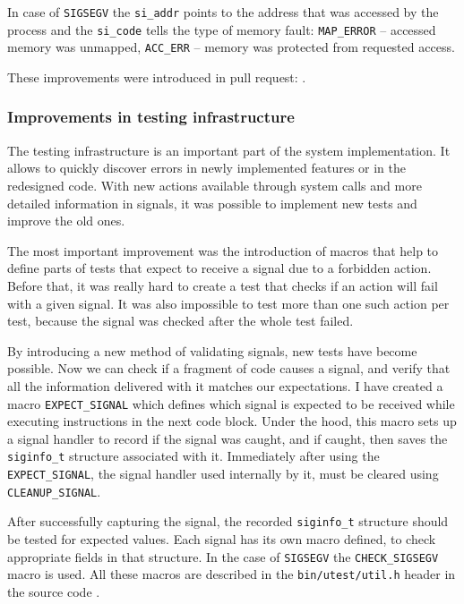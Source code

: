 In case of {\tt SIGSEGV} the \texttt{si_addr} points to the address that was accessed by the process and the \texttt{si_code}
tells the type of memory fault: \texttt{MAP_ERROR} -- accessed memory was unmapped, \texttt{ACC_ERR} -- memory was protected from requested access.

These improvements were introduced in pull request: .

\subsubsection{Improvements in testing infrastructure}

The testing infrastructure is an important part of the system implementation.
It allows to quickly discover errors in newly implemented features or in the redesigned code.
With new actions available through system calls and more detailed information in signals, it was possible to implement new tests and improve the old ones.

The most important improvement was the introduction of macros that help to define parts of tests that expect to receive a signal due to a forbidden action.
Before that, it was really hard to create a test that checks if an action will fail with a given signal.
It was also impossible to test more than one such action per test, because the signal was checked after the whole test failed.

By introducing a new method of validating signals, new tests have become possible.
Now we can check if a fragment of code causes a signal, and verify that all the information delivered with it matches our expectations.
I have created a macro \texttt{EXPECT_SIGNAL} which defines which signal is expected to be received while executing instructions in the next code block.
Under the hood, this macro sets up a signal handler to record if the signal was caught, and if caught,
then saves the \texttt{siginfo_t} structure associated with it.
Immediately after using the \texttt{EXPECT_SIGNAL}, the signal handler used internally by it, must be cleared using \texttt{CLEANUP_SIGNAL}.

After successfully capturing the signal, the recorded \texttt{siginfo_t} structure should be tested for expected values.
Each signal has its own macro defined, to check appropriate fields in that structure.
In the case of {\tt SIGSEGV} the \texttt{CHECK_SIGSEGV} macro is used.
All these macros are described in the \texttt{bin/utest/util.h} header in the source code \cite{mimiker:sources}.

